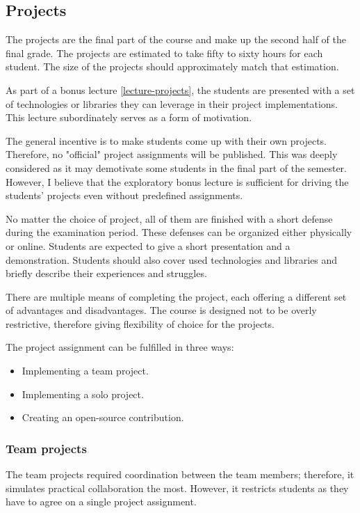 \documentclass[
  digital,
  color,
  oneside,
  nosansbold,
  nocolorbold,
  lof,
  lot,
]{fithesis4}
\begin{document}
\subsection{Projects}

The projects are the final part of the course and make up the second half of the final grade. The projects are estimated to take fifty to sixty hours for each student. The size of the projects should approximately match that estimation.

As part of a bonus lecture \cref{lecture-projects}, the students are presented with a set of technologies or libraries they can leverage in their project implementations. This lecture subordinately serves as a form of motivation.

The general incentive is to make students come up with their own projects. Therefore, no "official" project assignments will be published. This was deeply considered as it may demotivate some students in the final part of the semester. However, I believe that the exploratory bonus lecture is sufficient for driving the students' projects even without predefined assignments.

No matter the choice of project, all of them are finished with a short defense during the examination period. These defenses can be organized either physically or online. Students are expected to give a short presentation and a demonstration. Students should also cover used technologies and libraries and briefly describe their experiences and struggles.

There are multiple means of completing the project, each offering a different set of advantages and disadvantages. The course is designed not to be overly restrictive, therefore giving flexibility of choice for the projects.

The project assignment can be fulfilled in three ways:
\begin{itemize}
 \item Implementing a team project.
 \item Implementing a solo project.
 \item Creating an open-source contribution.
\end{itemize}

\subsubsection{Team projects}

The team projects required coordination between the team members; therefore, it simulates practical collaboration the most. However, it restricts students as they have to agree on a single project assignment. 
\end{document}
